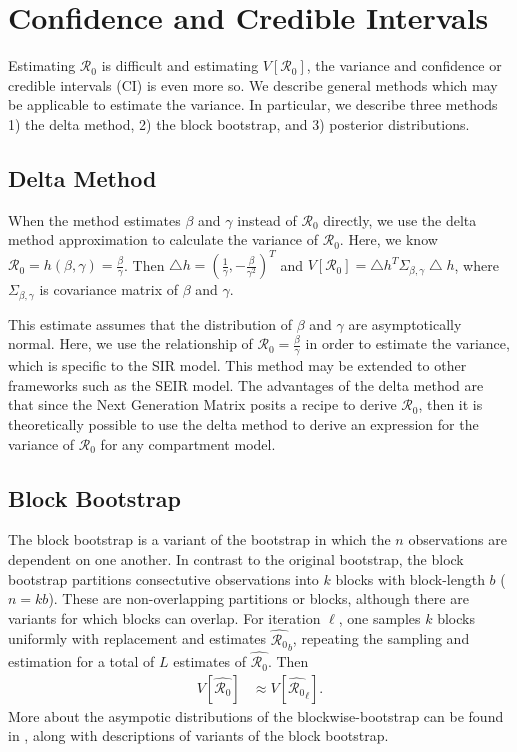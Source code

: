\documentclass[12pt]{article}
\newcommand{\rr}{\ensuremath{\mathcal{R}_0}}
\begin{document}
\section{Confidence and Credible Intervals}
\label{sec:ci}

Estimating $\rr$ is difficult and estimating $V[\rr]$, the variance and confidence or credible intervals (CI) is even more so.  We describe general methods which may be applicable to estimate the variance.  In particular, we describe three methods 1) the delta method, 2) the block bootstrap, and 3) posterior distributions.




\subsection{Delta Method}\label{delta-method}

When the method estimates \(\beta\) and \(\gamma\) instead of \(\rr\) directly, we use the delta method approximation to calculate the
variance of \(\rr\). Here, we know \(\rr = h(\beta, \gamma) = \frac{\beta}{\gamma}\). Then \(\bigtriangleup h = (\frac{1}{\gamma},  -\frac{\beta}{\gamma^2})^T\) and \(V[\rr] = \bigtriangleup h^T \Sigma_{\beta, \gamma} \bigtriangleup h\), where \(\Sigma_{\beta, \gamma}\) is covariance matrix of \(\beta\) and \(\gamma\).

This estimate assumes that the distribution of $\beta$ and $\gamma$ are asymptotically normal.  Here, we use the relationship of $\rr = \frac{\beta}{\gamma}$ in order to estimate the variance, which is specific to the SIR model.  This method may be extended to other frameworks such as the SEIR model.  The advantages of the delta method are that since the Next Generation Matrix \citep{diekmann2009} posits a recipe to derive $\rr$, then it is theoretically possible to use the delta method to derive an expression for the variance of $\rr$ for any compartment model.

\subsection{Block Bootstrap}

The block bootstrap is a variant of the bootstrap in which the $n$ observations are dependent on one another.  In contrast to the original bootstrap, the block bootstrap partitions consectutive observations into $k$ blocks with block-length $b$ ($n=kb$).  These are non-overlapping partitions or blocks, although there are variants for which blocks can overlap.  For iteration $\ell$, one samples $k$ blocks uniformly with replacement and estimates $\hat{\rr}_b$, repeating the sampling and estimation for a total of $L$ estimates of $\hat{\rr}$.  Then
\begin{align*}
  V\left [ \hat{\rr} \right ] &\approx V\left [\hat{\rr}_\ell \right ].
\end{align*}
More about the asympotic distributions of the blockwise-bootstrap can be found in \cite{cao1999}, along with descriptions of variants of the block bootstrap.
\end{document}
